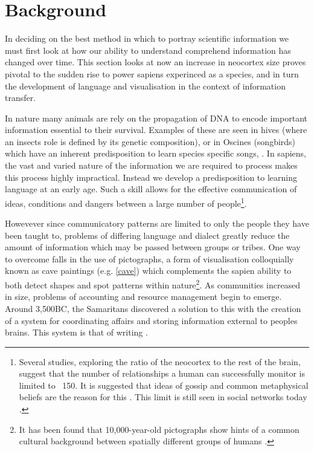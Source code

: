 
\section*{Background}

In deciding on the best method in which to portray scientific information we must first look at how our ability to understand comprehend information has changed over time. This section looks at now an increase in neocortex size proves pivotal to the sudden rise to power sapiens experinced as a species, and in turn the development of language and visualisation in the context of information transfer. 

In nature many animals are rely on the propagation of DNA to encode important information essential to their survival. Examples of these are seen in hives (where an insects role is defined by its genetic composition), or in Oscines (songbirds) which have an inherent predisposition to learn species specific songs, \cite{modelingpythonbees,genomics,birds,birdsongs,sapiens}.
In sapiens, the vast and varied nature of the information we are required to process makes this process highly impractical. Instead we develop a predisposition to learning language at an early age. Such a skill allows for the effective communication of ideas, conditions and dangers between a large number of people\footnote{Several studies, exploring the ratio of the neocortex to the rest of the brain, suggest that the number of relationships a human can successfully monitor is limited to ~150. It is suggested that ideas of gossip and common metaphysical beliefs are the reason for this \cite{sapiens,neo,gossip}. This limit is still seen in social networks today \cite{social}.}.

Howevever since communicatory patterns are limited to only the people they have been taught to, problems of differing language and dialect greatly reduce the amount of information which may be passed between groups or tribes. One way to overcome falls in the use of pictographs, a form of visualisation colloquially known as cave paintings (e.g. \autoref{cave}) which complements the sapien ability to both detect shapes and spot patterns within nature\footnote{It has been found that 10,000-year-old pictographs show hints of a common cultural background between spatially different groups of humans \cite{cave}.}. As communities increased in size, problems of accounting and resource management begin to emerge. Around 3,500BC, the Samaritans discovered 
a solution to this with the creation of a system for coordinating affairs and storing information external to peoples brains. This system is that of writing \cite{archaic,beforeCuneiform}. 

